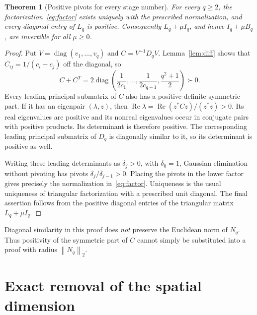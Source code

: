 \documentclass[11pt,letterpaper]{article}
\newtheorem{theorem}{Theorem}[section]
\theoremstyle{remark}
\newcommand{\Id}{I}
\newcommand{\norm}[1]{\left\|#1\right\|_2}
\begin{document}
\begin{theorem}[Positive pivots for every stage number]\label{thm:pivots}
For every \(q\ge2\), the factorization~\eqref{eq:factor} exists uniquely with
the prescribed normalization, and every diagonal entry of \(L_q\) is positive.
Consequently \(L_q+\mu\Id_q\), and hence \(\Id_q+\mu B_q\), are invertible
for all \(\mu\ge0\).
\end{theorem}
\begin{proof}
Put \(V=\operatorname{diag}(v_1,\ldots,v_q)\) and \(C=V^{-1}D_qV\).
Lemma~\ref{lem:diff} shows that \(C_{ij}=1/(c_i-c_j)\) off the diagonal, so
\[
 C+C^T=2\operatorname{diag}\left(\frac1{2c_1},\ldots,
       \frac1{2c_{q-1}},\frac{q^2+1}{2}\right)\succ0.
\]
Every leading principal submatrix of \(C\) also has a positive-definite
symmetric part. If it has an eigenpair \((\lambda,z)\), then
\(\operatorname{Re}\lambda=\operatorname{Re}(z^*Cz)/(z^*z)>0\).
Its real eigenvalues are positive and its nonreal eigenvalues occur in
conjugate pairs with positive products. Its determinant is therefore positive.
The corresponding leading principal submatrix of \(D_q\) is diagonally
similar to it, so its determinant is positive as well.

Writing these leading determinants as \(\delta_j>0\), with \(\delta_0=1\),
Gaussian elimination without pivoting has pivots
\(\delta_j/\delta_{j-1}>0\). Placing the pivots in the lower factor gives
precisely the normalization in~\eqref{eq:factor}. Uniqueness is the usual
uniqueness of triangular factorization with a prescribed unit diagonal.
The final assertion follows from the positive diagonal entries of the
triangular matrix \(L_q+\mu\Id_q\).
\end{proof}

Diagonal similarity in this proof does \emph{not} preserve the Euclidean norm
of \(N_q\). Thus positivity of the symmetric part of \(C\) cannot simply be
substituted into a proof with radius \(\norm{N_q}\).

\section{Exact removal of the spatial dimension}
\end{document}
